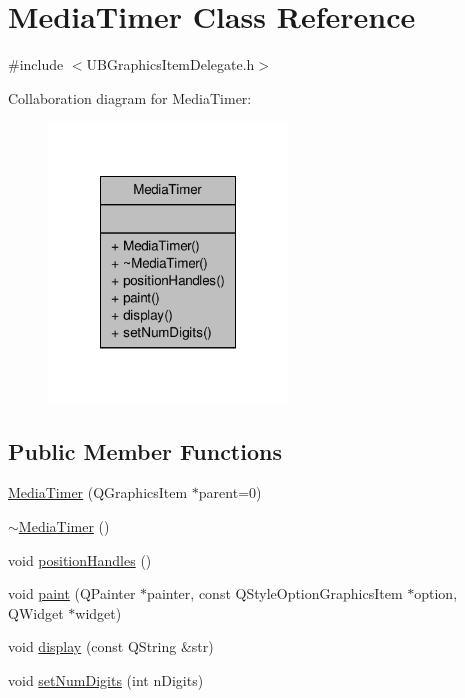 \hypertarget{class_media_timer}{\section{Media\-Timer Class Reference}
\label{db/dc2/class_media_timer}
}


{\ttfamily \#include $<$U\-B\-Graphics\-Item\-Delegate.\-h$>$}



Collaboration diagram for Media\-Timer\-:
\nopagebreak
\begin{figure}[H]
\begin{center}
\leavevmode
\includegraphics[width=180pt]{df/d44/class_media_timer__coll__graph}
\end{center}
\end{figure}
\subsection*{Public Member Functions}
\begin{DoxyCompactItemize}
\item 
\hyperlink{class_media_timer_adad4a492d0515d2623893a60c6a781b6}{Media\-Timer} (Q\-Graphics\-Item $\ast$parent=0)
\item 
\hyperlink{class_media_timer_ab02f693f5876637df33d5781a0ad7d2f}{$\sim$\-Media\-Timer} ()
\item 
void \hyperlink{class_media_timer_a27212b4d06275e25e2488f0757cbfbd7}{position\-Handles} ()
\item 
void \hyperlink{class_media_timer_af67c8b1d3b6daccd17b403087e316558}{paint} (Q\-Painter $\ast$painter, const Q\-Style\-Option\-Graphics\-Item $\ast$option, Q\-Widget $\ast$widget)
\item 
void \hyperlink{class_media_timer_a035f4771f2d409ccaa3d347f31aa8dfc}{display} (const Q\-String \&str)
\item 
void \hyperlink{class_media_timer_a2cbb7719237a850fd7a49ea68c24a343}{set\-Num\-Digits} (int n\-Digits)
\end{DoxyCompactItemize}


